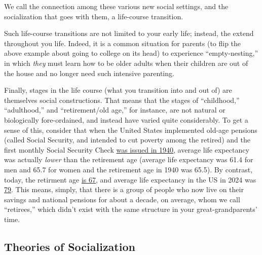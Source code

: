 \documentclass[
  letterpaper,
  DIV=11,
  numbers=noendperiod,
  oneside]{scrartcl}
\begin{document}
We call the connection among these various new social settings, and the
socialization that goes with them, a life-course transition.

Such life-course transitions are not limited to your early life;
instead, the extend throughout you life. Indeed, it is a common
situation for parents (to flip the above example about going to college
on its head) to experience ``empty-nesting,'' in which \emph{they} must
learn how to be older adults when their children are out of the house
and no longer need such intensive parenting.

Finally, stages in the life course (what you transition into and out of)
are themselves social constructions. That means that the stages of
``childhood,'' ``adulthood,'' and ``retirement/old age,'' for instance,
are not natural or biologically fore-ordained, and instead have varied
quite considerably. To get a sense of this, consider that when the
United States implemented old-age pensions (called Social Security, and
intended to cut poverty among the retired) and the first monthly Social
Security Check
\href{https://en.wikipedia.org/wiki/Social_Security_(United_States)}{was
issued in 1940}, average life expectancy was actually \emph{lower} than
the retirement age (average life expectancy was 61.4 for men and 65.7
for women and the retirement age in 1940 was 65.5). By contrast, today, the retirment age
\href{https://www.ssa.gov/oact/progdata/nra.html}{is 67}, and average
life expectancy in the US in 2024 was
\href{https://www.cdc.gov/nchs/products/databriefs/db548.htm}{79}. This
means, simply, that there is a group of people who now live on their
savings and national pensions for about a decade, on average, whom we
call ``retirees,'' which didn't exist with the same structure in your
great-grandparents' time.

\subsection{Theories of Socialization}\label{theories-of-socialization}
\end{document}
